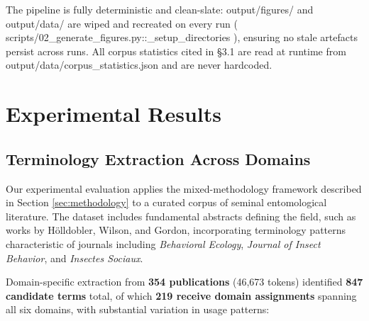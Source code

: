 \documentclass[
]{article}
\numberwithin{equation}{section}
\renewcommand{\texttt}[1]{%
    \colorbox{codebg}{\color{codefg}\ttfamily #1}%
}
\begin{document}
The pipeline is fully deterministic and clean-slate:
\texttt{output/figures/} and \texttt{output/data/} are wiped and
recreated on every run
(\texttt{scripts/02\_generate\_figures.py::\_setup\_directories}),
ensuring no stale artefacts persist across runs. All corpus statistics
cited in §3.1 are read at runtime from
\texttt{output/data/corpus\_statistics.json} and are never hardcoded.

\newpage

\section{Experimental Results}\label{sec:experimental_results}

\subsection{Terminology Extraction Across
Domains}\label{terminology-extraction-across-domains}

Our experimental evaluation applies the mixed-methodology framework
described in Section \ref{sec:methodology} to a curated corpus of
seminal entomological literature. The dataset includes fundamental
abstracts defining the field, such as works by Hölldobler, Wilson, and
Gordon, incorporating terminology patterns characteristic of journals
including \emph{Behavioral Ecology}, \emph{Journal of Insect Behavior},
and \emph{Insectes Sociaux}.

Domain-specific extraction from \textbf{354 publications} (46,673
tokens) identified \textbf{847 candidate terms} total, of which
\textbf{219 receive domain assignments} spanning all six domains, with
substantial variation in usage patterns:
\end{document}
